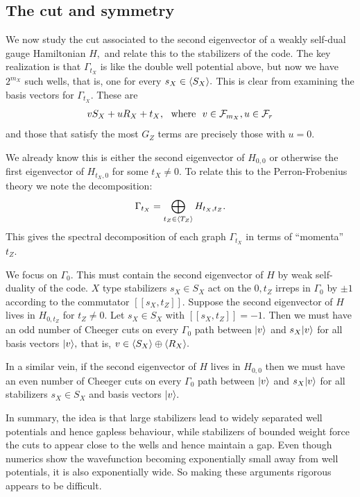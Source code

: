 \subsection{The cut and symmetry}

We now study 
the cut associated to the second eigenvector of a 
weakly self-dual gauge Hamiltonian $H,$
and relate this to the stabilizers of the code.
The key realization is that $\Gamma_{t_X}$ is like
the double well potential above,
but now we have $2^{m_X}$ such wells,
that is, one for every $s_X\in \langle S_X \rangle.$
This is clear from examining the basis vectors for $\Gamma_{t_X}.$
These are 
$$
    v S_X + u R_X + t_X, \ \ \mbox{where}\ \  v\in \mathcal{F}_{m_X}, u\in\mathcal{F}_{r}
$$
and those that satisfy the most $G_Z$ terms are
precisely those with $u=0.$

We already know this is either the second eigenvector of $H_{0,0}$
or otherwise the first eigenvector of $H_{t_X,0}$ for some $t_X \ne 0.$
To relate this to the Perron-Frobenius theory we note the 
decomposition:
$$
    \Gamma_{t_X} = \bigoplus_{t_Z\in\langle T_Z \rangle} H_{t_X, t_Z}.
$$
This gives the spectral decomposition of each graph $\Gamma_{t_X}$ 
in terms of ``momenta'' $t_Z.$

We focus on $\Gamma_0.$
This must contain the second eigenvector of $H$ by weak self-duality of the code.
$X$ type stabilizers $s_X\in S_X$ act on the $0,t_Z$ irreps in $\Gamma_0$
by $\pm 1$ according to the commutator $[[s_X, t_Z]].$
Suppose the second eigenvector of $H$ lives in
$H_{0,t_Z}$ for $t_Z\ne 0$. 
Let $s_X\in S_X$ with $[[s_X, t_Z]]=-1.$
Then we must have an odd number of Cheeger cuts 
on every $\Gamma_0$ path between $|{v}\rangle$ and $s_X|{v}\rangle$ for all basis
vectors $|{v}\rangle,$ that is, $v\in\langle S_X \rangle\oplus\langle R_X \rangle.$

In a similar vein, if the second eigenvector of $H$ lives in $H_{0,0}$
then we must have an even number of Cheeger cuts 
on every $\Gamma_0$ path between $|{v}\rangle$ and $s_X|{v}\rangle$ for all stabilizers $s_X\in S_X$
and basis vectors $|{v}\rangle.$

In summary, the idea is that large stabilizers lead to
widely separated well potentials and hence gapless behaviour,
while stabilizers of bounded weight force the cuts to
appear close to the wells and hence maintain a gap.
Even though numerics show the wavefunction becoming 
exponentially small away from well potentials,
it is also exponentially wide.
So making these arguments rigorous appears to be difficult.

